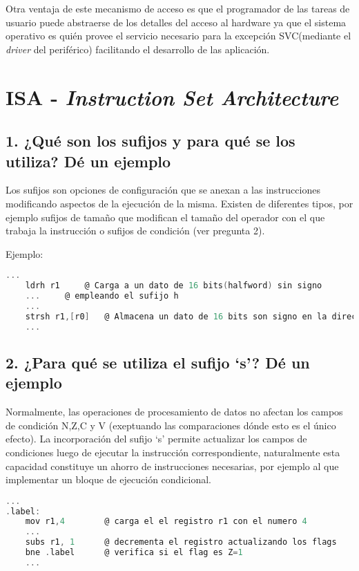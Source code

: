 \documentclass[10pt,a4paper,twoside,spanish]{article}	%
\begin{document}
Otra ventaja de este mecanismo de acceso es que el programador de las tareas de usuario puede abstraerse de los detalles del acceso al hardware ya que el sistema operativo es quién provee el servicio necesario para la excepción SVC(mediante el \textit{driver} del periférico) facilitando el desarrollo de las aplicación.

 
\section*{ISA - \textit{Instruction Set Architecture}}

\subsection*{1. ¿Qué son los sufijos y para qué se los utiliza? Dé un ejemplo}

Los sufijos son opciones de configuración que se anexan a las instrucciones modificando aspectos de la ejecución de la misma. Existen de diferentes tipos, por ejemplo sufijos de tamaño que modifican el tamaño del operador con el que trabaja la instrucción o sufijos de condición (ver pregunta 2).

Ejemplo:
\begin{lstlisting}[language=C]
	...
	ldrh r1		@ Carga a un dato de 16 bits(halfword) sin signo 
	...		@ empleando el sufijo h 
	...
	strsh r1,[r0]	@ Almacena un dato de 16 bits son signo en la direccion r0	
	...
\end{lstlisting}




\subsection*{2. ¿Para qué se utiliza el sufijo ‘s’? Dé un ejemplo}

Normalmente, las operaciones de procesamiento de datos no afectan los campos de condición N,Z,C y V  (exeptuando las comparaciones dónde esto es el único efecto). La incorporación del sufijo ‘s’ permite actualizar los campos de condiciones luego de ejecutar la instrucción correspondiente, naturalmente esta capacidad constituye un ahorro de instrucciones necesarias, por ejemplo al que implementar un bloque de ejecución condicional.

\begin{lstlisting}[language=C]
	...
.label:
	mov r1,4		@ carga el el registro r1 con el numero 4 
	...	
	subs r1, 1		@ decrementa el registro actualizando los flags			
	bne .label		@ verifica si el flag es Z=1
	...
\end{lstlisting}
\end{document}
